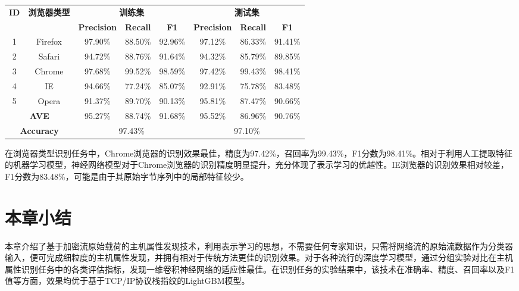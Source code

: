 \begin{table}[!h]
    \centering
    \footnotesize
    \setlength{\tabcolsep}{8pt}
    \renewcommand{\arraystretch}{1}
\begin{tabular}{|c|c|c|c|c|c|c|c|}
\hline
\multirow{2}{*}{ \textbf{ID}} & \multirow{2}{*}{ \textbf{浏览器类型}} & \multicolumn{3}{c|}{ \textbf{训练集}} & \multicolumn{3}{c|}{ \textbf{测试集}} \\ \cline{3-8} 
 &  &  \textbf{Precision} &  \textbf{Recall} &  \textbf{F1} & \textbf{Precision} &  \textbf{Recall} &  \textbf{F1} \\ \hline
1 & Firefox & 97.90\% & 88.50\% & 92.96\% & 97.12\% & 86.33\% & 91.41\% \\ \hline
2 & Safari & 94.72\% & 88.76\% & 91.64\% & 94.32\% & 85.79\% & 89.85\% \\ \hline
3 & Chrome & 97.68\% & 99.52\% & 98.59\% & 97.42\% & 99.43\% & 98.41\% \\ \hline
4 & IE & 94.66\% & 77.24\% & 85.07\% & 92.91\% & 75.78\% & 83.48\% \\ \hline
5 & Opera & 91.37\% & 89.70\% & 90.13\% & 95.81\% & 87.47\% & 90.66\% \\ \hline
\multicolumn{2}{|c|}{\textbf{AVE}} & 95.27\% & 88.74\% & 91.68\% & 95.52\% & 86.96\% & 90.76\%\\ \hline
\multicolumn{2}{|c|}{\textbf{Accuracy}} & \multicolumn{3}{c|}{97.43\%} & \multicolumn{3}{c|}{97.10\%} \\ \hline
\end{tabular}
\end{table}

在浏览器类型识别任务中，Chrome浏览器的识别效果最佳，精度为97.42\%，召回率为99.43\%，F1分数为98.41\%。相对于利用人工提取特征的机器学习模型，神经网络模型对于Chrome浏览器的识别精度明显提升，充分体现了表示学习的优越性。IE浏览器的识别效果相对较差，F1分数为83.48\%，可能是由于其原始字节序列中的局部特征较少。

\section{本章小结}

本章介绍了基于加密流原始载荷的主机属性发现技术，利用表示学习的思想，不需要任何专家知识，只需将网络流的原始流数据作为分类器输入，便可完成细粒度的主机属性发现，并拥有相对于传统方法更佳的识别效果。对于各种流行的深度学习模型，通过分组实验对比在主机属性识别任务中的各类评估指标，发现一维卷积神经网络的适应性最佳。在识别任务的实验结果中，该技术在准确率、精度、召回率以及F1值等方面，效果均优于基于TCP/IP协议栈指纹的LightGBM模型。



